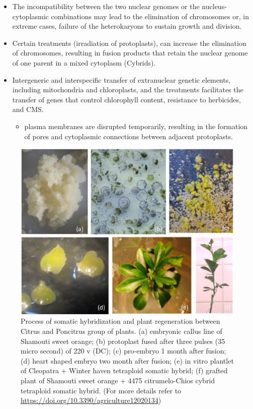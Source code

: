 \documentclass[
  ignorenonframetext,
  aspectratio=169]{beamer}
\providecommand{\tightlist}{%
  \setlength{\itemsep}{0pt}\setlength{\parskip}{0pt}}
\begin{document}
\begin{frame}{}
\protect\hypertarget{section-13}{}
\begin{itemize}
\tightlist
\item
  The incompatibility between the two nuclear genomes or the
  nucleus-cytoplasmic combinations may lead to the elimination of
  chromosomes or, in extreme cases, failure of the heterokaryons to
  sustain growth and division.
\item
  Certain treatments (irradiation of protoplasts), can increase the
  elimination of chromosomes, resulting in fusion products that retain
  the nuclear genome of one parent in a mixed cytoplasm (Cybrids).
\item
  Intergeneric and interspecific transfer of extranuclear genetic
  elements, including mitochondria and chloroplasts, and the treatments
  facilitates the transfer of genes that control chlorophyll content,
  resistance to herbicides, and CMS.

  \begin{itemize}
  \tightlist
  \item
    plasma membranes are disrupted temporarily, resulting in the
    formation of pores and cytoplasmic connections between adjacent
    protoplasts.
  \end{itemize}
\end{itemize}
\end{frame}

\begin{frame}{}
\protect\hypertarget{section-14}{}
\begin{figure}
\includegraphics[width=0.6\linewidth]{./../images/protoplast_fusion_citrus_genera} \caption{Process of somatic hybridization and plant regeneration between Citrus and Poncitrus group of plants. (a) embryonic callus line of Shamouti sweet orange; (b) protoplast fused after three pulses (35 micro second) of 220 v (DC); (c) pro-embryo 1 month after fusion; (d) heart shaped embryo two month after fusion; (e) in vitro plantlet of Cleopatra + Winter haven tetraploid somatic hybrid; (f) grafted plant of Shamouti sweet orange + 4475 citrumelo-Chios cybrid tetraploid somatic hybrid. (For more details refer to \url{https://doi.org/10.3390/agriculture12020134})}\label{fig:protoplast-fusion}
\end{figure}
\end{frame}
\end{document}
